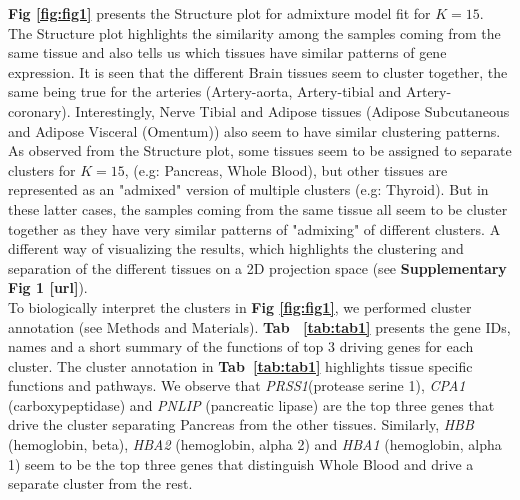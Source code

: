  \textbf{Fig \ref{fig:fig1}} presents the Structure plot for admixture model fit for $K=15$. The Structure plot highlights the similarity among the samples coming from the same tissue and also tells us which tissues have similar patterns of gene expression. It is seen that the different Brain tissues seem to cluster together, the same being true for the arteries (Artery-aorta, Artery-tibial and Artery-coronary). Interestingly, Nerve Tibial  and Adipose tissues (Adipose Subcutaneous and Adipose Visceral (Omentum)) also seem to have similar clustering patterns. \\[1 pt]
 
 As observed from the Structure plot, some tissues seem to be assigned to separate clusters for $K=15$, (e.g: Pancreas, Whole Blood), but other tissues are represented as an "admixed" version of multiple clusters (e.g: Thyroid). But in these latter cases, the samples coming from the same tissue all seem to be cluster together as they have very similar patterns of "admixing" of different clusters. A different way of visualizing the results, which highlights the clustering and separation of the different tissues on a 2D projection space (see \textbf{Supplementary Fig 1 [url]}). \\[1 pt]
 
To biologically interpret the clusters in  \textbf{Fig \ref{fig:fig1}}, we performed cluster annotation (see Methods and Materials). \textbf{Tab ~\ref{tab:tab1}} presents the gene IDs, names and a short summary of the functions of top $3$ driving genes for each cluster. The cluster annotation in \textbf{Tab~\ref{tab:tab1}} highlights tissue specific functions and pathways. We observe that \textit{PRSS1}(protease serine 1), \textit{CPA1} (carboxypeptidase) and \textit{PNLIP} (pancreatic lipase) are the  top three genes that drive the cluster separating Pancreas from the other tissues. Similarly, \textit{HBB} (hemoglobin, beta), \textit{HBA2} (hemoglobin, alpha 2) and \textit{HBA1} (hemoglobin, alpha 1) seem to be the top three genes that distinguish Whole Blood and drive a separate cluster from the rest. \\[2 pt]


